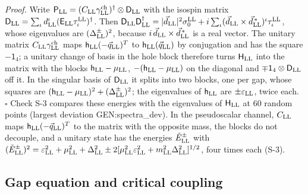 \noindent\emph{Proof.} Write $\mathsf P_{\rm LL}=(C_{\rm LL}\gamma^{\rm ch}_{\rm LL})^\dagger\otimes\mathsf
D_{\rm LL}$ with the isospin matrix $\mathsf D_{\rm LL}=\sum_\iota d^\iota_{\rm LL}(\mathsf E_{\rm
LL}\tau^{\rm LL}_\iota)^\dagger$. Then $\mathsf D_{\rm LL}\mathsf D_{\rm LL}^\dagger=\lvert\vec d_{\rm
LL}\rvert^2\sigma^{\rm LL}_0+i\sum_\iota(\vec d_{\rm LL}\times\vec d^{\,*}_{\rm LL})^\iota\tau^{\rm LL}_\iota$,
whose eigenvalues are $(\Delta^\pm_{\rm LL})^2$, because $i\,\vec d_{\rm LL}\times\vec d^{\,*}_{\rm LL}$ is a
real vector. The unitary matrix $C_{\rm LL}\gamma^{\rm ch}_{\rm LL}$ maps $\mathsf h_{\rm LL}(-\vec q_{\rm
LL})^T$ to $\mathsf h_{\rm LL}(\vec q_{\rm LL})$ by conjugation and has the square $-\mathsf 1_4$; a unitary
change of basis in the hole block therefore turns $\mathsf H_{\rm LL}$ into the matrix with the blocks
$\mathsf h_{\rm LL}-\mu_{\rm LL}$, $-(\mathsf h_{\rm LL}-\mu_{\rm LL})$ on the diagonal and $\mp\mathsf
1_4\otimes\mathsf D_{\rm LL}$ off it. In the singular basis of $\mathsf D_{\rm LL}$ it splits into two
blocks, one per gap, whose squares are $(\mathsf h_{\rm LL}-\mu_{\rm LL})^2+(\Delta^\pm_{\rm LL})^2$; the
eigenvalues of $\mathsf h_{\rm LL}$ are $\pm\varepsilon_{\rm LL}$, twice each. $\square$ Check S-3 compares
these energies with the eigenvalues of $\mathsf H_{\rm LL}$ at 60 random points (largest deviation
{{GEN:spectra_dev}}). In the pseudoscalar channel, $C_{\rm LL}$ maps $\mathsf h_{\rm LL}(-\vec q_{\rm
LL})^T$ to the matrix with the opposite mass, the blocks do not decouple, and a unitary state has the
energies $\tilde E^\pm_{\rm LL}$ with $(\tilde E^\pm_{\rm LL})^2=\varepsilon_{\rm LL}^2+\mu_{\rm
LL}^2+\Delta_{\rm LL}^2\pm2[\mu_{\rm LL}^2\varepsilon_{\rm LL}^2+m_{\rm LL}^2\Delta_{\rm LL}^2]^{1/2}$, four
times each (S-3).

\subsection{Gap equation and critical coupling}

